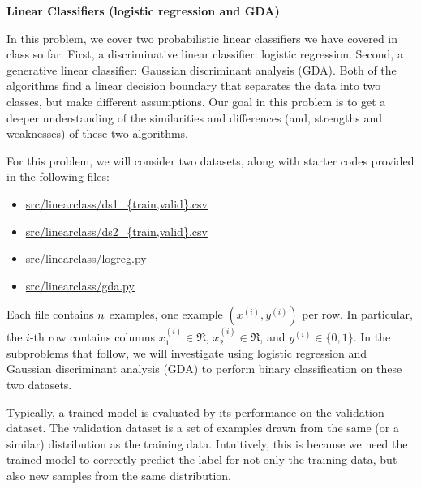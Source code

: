 \item {} {\bf Linear Classifiers (logistic regression and GDA)}

In this problem, we cover two probabilistic linear classifiers we have
covered in class so far. First, a discriminative linear classifier: logistic
regression. Second, a generative linear classifier: Gaussian discriminant
analysis (GDA). Both of the algorithms find a linear decision boundary that
separates the data into two classes, but make different assumptions. Our goal
in this problem is to get a deeper understanding of the similarities and
differences (and, strengths and weaknesses) of these two algorithms.

For this problem, we will consider two datasets, along with starter codes provided in the following
files:
\begin{center}
\begin{itemize} %
    \item \url{src/linearclass/ds1_{train,valid}.csv}
    \item \url{src/linearclass/ds2_{train,valid}.csv}
        \item \url{src/linearclass/logreg.py}
        \item \url{src/linearclass/gda.py}
\end{itemize}
\end{center}
Each file contains ${n}$ examples, one example $(x^{(i)}, y^{(i)})$ per row.
In particular, the $i$-th row contains columns $x^{(i)}_1\in\Re$,
$x^{(i)}_2\in\Re$, and $y^{(i)}\in\{0, 1\}$. In the subproblems that follow, we
will investigate using logistic regression and Gaussian discriminant analysis
(GDA) to perform binary classification on these two datasets.

Typically, a trained model is evaluated by its performance on the validation dataset. The validation dataset is a set of examples drawn from the same (or a similar) distribution as the training data. Intuitively, this is because we need the trained model to correctly predict the label for not only the training data, but also new samples from the same distribution.


